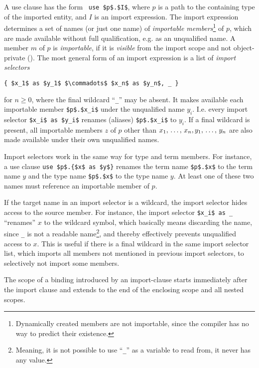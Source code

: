 A use clause has the form ~\lstinline!use $p$.$I$!, where $p$ is a path to the containing type of the imported entity, and $I$ is an import expression. The import expression determines a set of names (or just one name) of {\em importable members}\footnote{Dynamically created members are not importable, since the compiler has no way to predict their existence.} of $p$, which are made available without full qualification, e.g. as an unqualified name. A member $m$ of $p$ is {\em importable}, if it is {\em visible} from the import scope and not object-private (). The most general form of an import expression is a list of {\em import selectors}
\begin{lstlisting}
{ $x_1$ as $y_1$ $\commadots$ $x_n$ as $y_n$, _ }
\end{lstlisting}
for $n \ge 0$, where the final wildcard ``\lstinline!_!'' may be absent. It makes available each importable member \lstinline!$p$.$x_i$! under the unqualified name $y_i$. I.e. every import selector \lstinline!$x_i$ as $y_i$! renames (aliases) \lstinline!$p$.$x_i$! to $y_i$. If a final wildcard is present, all importable members $z$ of $p$ other than $x_1 ,\, \ldots ,\, x_n, y_1 ,\, \ldots ,\, y_n$ are also made available under their own unqualified names. 

Import selectors work in the same way for type and term members. For instance, a use clause \lstinline!use $p$.{$x$ as $y$}! renames the term name \lstinline!$p$.$x$! to the term name $y$ and the type name \lstinline!$p$.$x$! to the type name $y$. At least one of these two names must reference an importable member of $p$. 

If the target name in an import selector is a wildcard, the import selector hides access to the source member. For instance, the import selector \lstinline!$x_i$ as _! ``renames'' $x$ to the wildcard symbol, which basically means discarding the name, since \lstinline!_! is not a readable name\footnote{Meaning, it is not possible to use ``\lstinline!_!'' as a variable to read from, it never has any value.}, and thereby effectively prevents unqualified access to $x$. This is useful if there is a final wildcard in the same import selector list, which imports all members not mentioned in previous import selectors, to selectively not import some members. 

The scope of a binding introduced by an import-clause starts immediately after the import clause and extends to the end of the enclosing scope and all nested scopes. 

